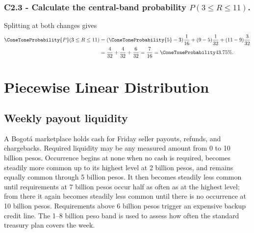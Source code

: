 \subsubsection*{C2.3 - Calculate the central-band probability
$P(3\le R\le11)$.}
\label{subsec:c2-piecewise-uniform-refund-c}
Splitting at both changes gives
\[
 \begin{aligned}
 \ConeToneProbability{P}(3\le R\le11)
 &=(\ConeToneProbability{5}-3)\frac1{16}+(9-5)\frac1{32}+(11-9)\frac3{32}\\
 &=\frac4{32}+\frac4{32}+\frac6{32}=\frac7{16}=\ConeToneProbability{43.75\%}.
 \end{aligned}
\]

\section{Piecewise Linear Distribution}\label{sec:c2-piecewise-linear-practice}

\subsection{Weekly payout liquidity}\label{sec:c2-piecewise-linear-liquidity}
A Bogotá marketplace holds cash for Friday seller payouts, refunds, and
chargebacks.  Required liquidity may be any measured amount from 0 to 10
billion pesos.  Occurrence begins at none when no cash is required,
becomes steadily more common up to its highest level at 2 billion pesos, and
remains equally common through 5 billion pesos.  It then becomes steadily less
common until requirements at 7 billion pesos occur half as often as at the
highest level; from there it again becomes steadily less common until there is
no occurrence at 10 billion pesos.  Requirements above 6 billion
pesos trigger an expensive backup credit line.  The 1--8 billion peso band is
used to assess how often the standard treasury plan covers the week.

\begingroup{}
\endgroup

